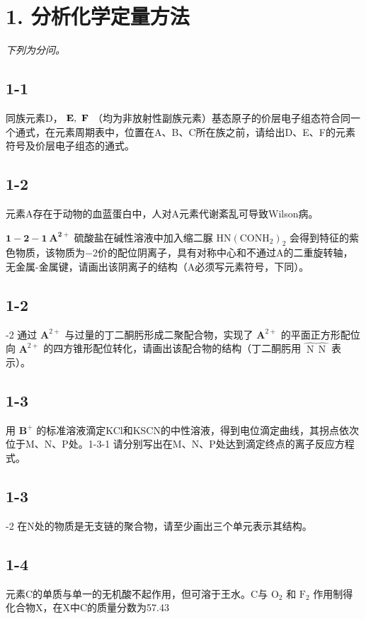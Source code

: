 \section*{1. 分析化学定量方法}
\textit{下列为分问。}

\subsection*{1-1}
同族元素D， $\mathrm { { \bf E } } , \mathrm { { \bf ~ F } }$ （均为⾮放射性副族元素）基态原⼦的价层电⼦组态符合同⼀个通式，在元素周期表中，位置在A、B、C所在族之前，请给出D、E、F的元素符号及价层电⼦组态的通式。

\subsection*{1-2}
元素A存在于动物的⾎蓝蛋⽩中，⼈对A元素代谢紊乱可导致Wilson病。

$\mathbf { 1 - 2 - 1 \ A ^ { 2 + } }$ 硫酸盐在碱性溶液中加⼊缩⼆脲 $\mathrm { { H N } ( C O N H _ { 2 } ) _ { 2 } }$ 会得到特征的紫⾊物质，该物质为−2价的配位阴离⼦，具有对称中⼼和不通过A的⼆重旋转轴，⽆⾦属-⾦属键，请画出该阴离⼦的结构（A必须写元素符号，下同）。

\subsection*{1-2}
-2 通过 $\mathbf { A } ^ { 2 + }$ 与过量的丁⼆酮肟形成⼆聚配合物，实现了 $\mathbf { A } ^ { 2 + }$ 的平⾯正⽅形配位向 $\mathbf { A } ^ { 2 + }$ 的四⽅锥形配位转化，请画出该配合物的结构（丁⼆酮肟⽤ $\widehat { \mathrm { ~ N ~ } } \widehat { \mathrm { ~ N ~ } }$ 表⽰）。

\subsection*{1-3}
⽤ $\mathbf { B } ^ { + }$ 的标准溶液滴定KCl和KSCN的中性溶液，得到电位滴定曲线，其拐点依次位于M、N、P处。1-3-1 请分别写出在M、N、P处达到滴定终点的离⼦反应⽅程式。

\subsection*{1-3}
-2 在N处的物质是⽆⽀链的聚合物，请⾄少画出三个单元表⽰其结构。

\subsection*{1-4}
元素C的单质与单⼀的⽆机酸不起作⽤，但可溶于王⽔。C与 $\mathrm { O _ { 2 } }$ 和 $\mathrm { F } _ { 2 }$ 作⽤制得化合物X，在X中C的质量分数为57.43%
